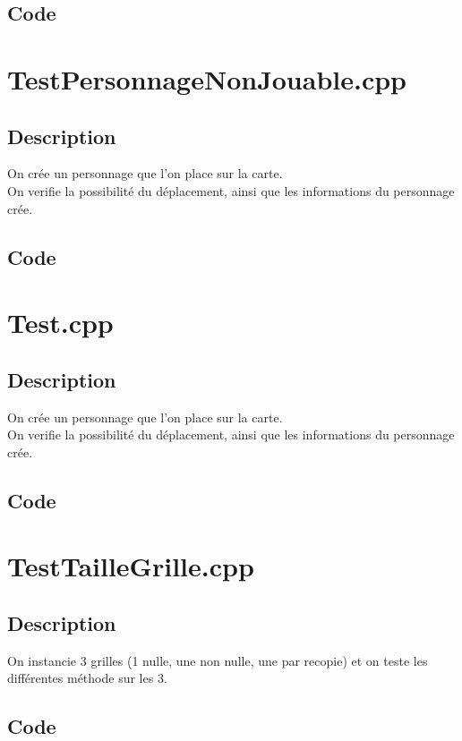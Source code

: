         \subsection{Code}
    \section{TestPersonnageNonJouable.cpp}
        \subsection{Description}
            On crée un personnage que l'on place sur la carte.\\
            On verifie la possibilité du déplacement, ainsi que les informations du personnage crée.
        \subsection{Code}
    \section{Test.cpp}
        \subsection{Description}
            On crée un personnage que l'on place sur la carte.\\
            On verifie la possibilité du déplacement, ainsi que les informations du personnage crée.
        \subsection{Code}
    \section{TestTailleGrille.cpp}
        \subsection{Description}
            On instancie 3 grilles (1 nulle, une non nulle, une par recopie) et on teste les différentes méthode sur les 3.
        \subsection{Code}
